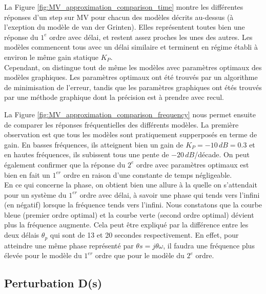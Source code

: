 La Figure \ref{fig:MV_approximation_comparison_time} montre les différentes réponses d'un step sur MV pour chacun des modèles décrits au-dessus (à l'exeption du modèle de van der Grinten).
Elles représentent toutes bien une réponse du $1^{e}$ ordre avec délai, et restent assez proches les unes des autres.
Les modèles commencent tous avec un délai similaire et terminent en régime établi à environ le même gain statique $K_P$.\\
Cependant, on distingue tout de même les modèles avec paramètres optimaux des modèles graphiques.
Les paramètres optimaux ont été trouvés par un algorithme de minimisation de l'erreur, tandis que les paramètres graphiques ont étés trouvés par une méthode graphique dont la précision est à prendre avec recul.
\par
La Figure \ref{fig:MV_approximation_comparison_frequency} nous permet ensuite de comparer les réponses fréquentielles des différents modèles.
La première observation est que tous les modèles sont pratiquement supperposés en terme de gain.
En basses fréquences, ils atteignent bien un gain de $K_P = -10\,dB = 0.3$ et en hautes fréquences, ils subissent tous une pente de $-20\,dB$/décade.
On peut également confirmer que la réponse du $2^{e}$ ordre avec paramètres optimaux est bien en fait un $1^{er}$ ordre en raison d'une constante de temps négligeable.\\
En ce qui concerne la phase, on obtient bien une allure à la quelle on s'attendait pour un système du $1^{er}$ ordre avec délai, à savoir une phase qui tends vers l'infini (en négatif) lorsque la fréquence tends vers l'infini.
Nous constatons que la courbe bleue (premier ordre optimal) et la courbe verte (second ordre optimal) dévient plus la fréquence augmente. Cela peut être expliqué par la différence entre les deux délais $\theta_p$ qui sont de 13 et 20 secondes respectivement.
En effet, pour atteindre une même phase représenté par $\theta s = j\theta\omega$, il faudra une fréquence plus élevée pour le modèle du $1^{er}$ ordre que pour le modèle du $2^{e}$ ordre. 

\subsection{Perturbation D(s)}

